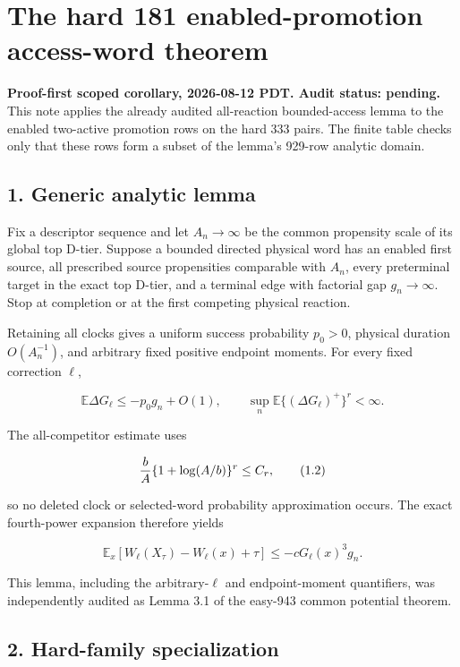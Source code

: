 \section{The hard 181 enabled-promotion access-word
theorem}

\textbf{Proof-first scoped corollary, 2026-08-12 PDT. Audit status:
pending.} This note applies the already audited all-reaction
bounded-access lemma to the enabled two-active promotion rows on the
hard 333 pairs. The finite table checks only that these rows form a
subset of the lemma's 929-row analytic domain.

\subsection{1. Generic analytic lemma}

Fix a descriptor sequence and let \(A_n\to\infty\) be the common
propensity scale of its global top D-tier. Suppose a bounded directed
physical word has an enabled first source, all prescribed source
propensities comparable with \(A_n\), every preterminal target in the
exact top D-tier, and a terminal edge with factorial gap
\(g_n\to\infty\). Stop at completion or at the first competing physical
reaction.

Retaining all clocks gives a uniform success probability \(p_0>0\),
physical duration \(O(A_n^{-1})\), and arbitrary fixed positive endpoint
moments. For every fixed correction \(\ell\),

\[
 \mathbb E\Delta G_\ell\le-p_0g_n+O(1),\qquad
 \sup_n\mathbb E\{(\Delta G_\ell)^+\}^r<\infty.      \tag{1.1}
\]

The all-competitor estimate uses

\[
 {b\over A}\{1+\log(A/b)\}^r\le C_r,                \tag{1.2}
\]

so no deleted clock or selected-word probability approximation occurs.
The exact fourth-power expansion therefore yields

\[
 \mathbb E_x[W_\ell(X_\tau)-W_\ell(x)+\tau]
      \le-cG_\ell(x)^3g_n.                           \tag{1.3}
\]

This lemma, including the arbitrary-\(\ell\) and endpoint-moment
quantifiers, was independently audited as Lemma 3.1 of the easy-943
common potential theorem.

\subsection{2. Hard-family
specialization}

